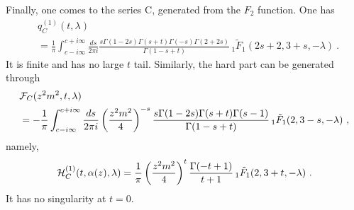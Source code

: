 \documentclass[a4paper,11pt]{article}
\begin{document}
Finally, one comes to the series C, generated from the  $F_2$ function. One has
\begin{align}\label{eq:qc}
&q^{(1)}_C(t,\lambda)\nonumber \\ 
&=\frac{1}{\pi}\int_{c-i\infty}^{c+i\infty} \frac{ds}{2\pi i}  \frac{s\Gamma(1-2s)\Gamma(s+t)\Gamma(-s)\Gamma(2+2s)}{\Gamma(1-s+t)}\,_1\tilde F_1(2s+2,3+s,-\lambda) \ .
\end{align}
It is finite and has no large $t$ tail. Similarly, the hard part can be generated through
\begin{align}
&{\cal F}_{C}(z^2m^2,t,\lambda)\nonumber \\ 
&=-\frac{1}{\pi}\int_{c-i\infty}^{c+i\infty} \frac{ds}{2\pi i}  \left(\frac{z^2m^2}{4}\right)^{-s} \frac{s\Gamma(1-2s)\Gamma(s+t)\Gamma(s-1)}{\Gamma(1-s+t)}\,_1\tilde F_1(2,3-s,-\lambda) \ , 
\end{align}
namely,
\begin{align}\label{eq:hc}
{\cal H}^{(1)}_C(t,\alpha(z),\lambda)=\frac{1}{\pi}\left(\frac{z^2m^2}{4}\right)^{t} \frac{\Gamma(-t+1)}{t+1}\,_1\tilde F_1(2,3+t,-\lambda) \ .
\end{align}
It has no singularity at $t=0$. 
\end{document}
